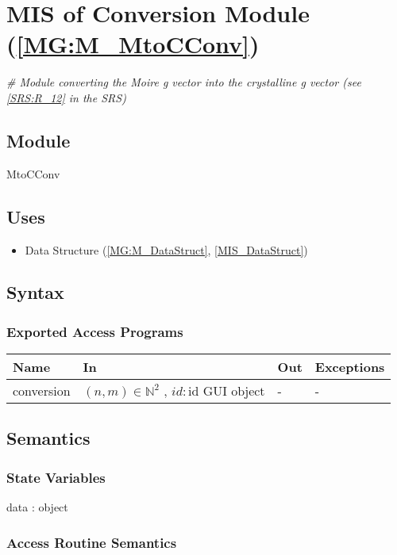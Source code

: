 \documentclass[12pt, titlepage]{article}
\begin{document}
\section{MIS of Conversion Module (\texorpdfstring{\cref{MG:M_MtoCConv}}))} 
\label{MIS_MtoCConv}

\noindent\textit{{\#} Module converting the Moire g vector into the crystalline 
g vector (see \cref{SRS:R_12} in the SRS)}

\subsection{Module}
MtoCConv
\subsection{Uses}
\begin{itemize}
\item Data Structure (\cref{MG:M_DataStruct}, \cref{MIS_DataStruct})
\end{itemize}

\subsection{Syntax}

\subsubsection{Exported Access Programs}

\begin{center}
\begin{tabular}{p{2cm} p{4cm} p{4cm} p{2cm}}
\hline
\textbf{Name} & \textbf{In} & \textbf{Out} & \textbf{Exceptions} \\
\hline
conversion & $(n,m) \in \mathbb{N}^2$ , $id : \text{id GUI object}$  & - & - \\
\hline
\end{tabular}
\end{center}

\subsection{Semantics}

\subsubsection{State Variables}
data : object

\subsubsection{Access Routine Semantics}
\end{document}
